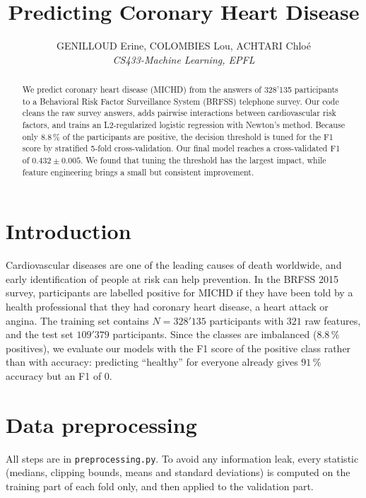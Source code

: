 \documentclass[10pt,conference,compsocconf]{IEEEtran}
\begin{document}
\title{Predicting Coronary Heart Disease}

\author{
  GENILLOUD Erine, COLOMBIES Lou, ACHTARI Chlo\'e \\
  \textit{CS433-Machine Learning, EPFL}
}

\maketitle

\begin{abstract}
We predict coronary heart disease (MICHD) from the answers of 328{'}135 participants
to a Behavioral Risk Factor Surveillance System (BRFSS) telephone survey. Our code cleans the raw survey answers, adds pairwise interactions between cardiovascular risk factors, and trains an L2-regularized logistic regression with Newton's method. Because only 8.8\,\%
of the participants are positive, the decision threshold is tuned for the F1 score by
stratified 5-fold cross-validation. Our final model reaches a cross-validated F1 of
$0.432 \pm 0.005$. We found that tuning the threshold has the largest impact, while feature
engineering brings a small but consistent improvement.
\end{abstract}

\section{Introduction}
Cardiovascular diseases are one of the leading causes of death worldwide, and early
identification of people at risk can help prevention. In the BRFSS 2015 survey,
participants are labelled positive for MICHD if they have been told
by a health professional that they had coronary heart disease, a heart attack or angina.
The training set contains $N = 328{'}135$ participants with $321$ raw features, and the test set $109{'}379$ participants. Since the classes are imbalanced ($8.8\,\%$ positives), we evaluate our models with the F1 score of the
positive class rather than with accuracy: predicting ``healthy'' for everyone already
gives $91\,\%$ accuracy but an F1 of $0$.

\section{Data preprocessing}
\label{sec:preprocessing}
All steps are in \texttt{preprocessing.py}. To avoid any information leak, every
statistic (medians, clipping bounds, means and standard deviations) is computed on the
training part of each fold only, and then applied to the validation part.
\end{document}
